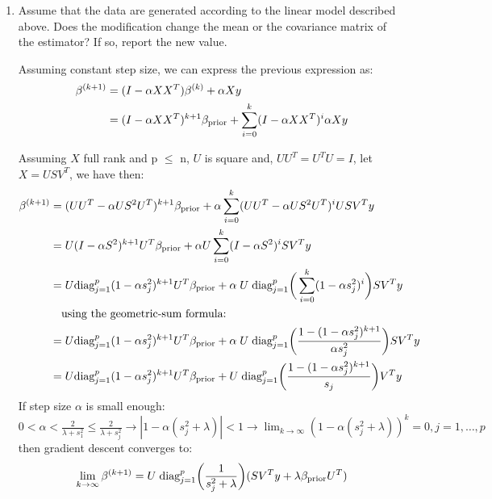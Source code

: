 \documentclass[12pt,twoside]{article}
\begin{document}
\begin{enumerate}
\begin{enumerate}
    \item Assume that the data are generated according to the linear model described above. Does the modification change the mean or the covariance matrix of the estimator? If so, report the new value.\\
    
\medskip

Assuming constant step size, we can express the previous expression as:
\begin{align*}
		\beta^{(k+1)}	&=	( I - \alpha X X^T ) \beta^{(k)} +  \alpha X y \\
					&=	(I - \alpha X X^T)^{k+1} \beta_{\operatorname{prior}}	+ \sum_{i=0}^k (I - \alpha X X^T)^i \alpha X y 
\end{align*}

Assuming $X$ full rank and p $\le$ n, $U$ is square and, $UU^T = U^TU = I$, let $X = USV^T$, we have then:
\begin{align*}
		\beta^{(k+1)}	&=	(UU^T - \alpha US^2 U^T)^{k+1} \beta_{\operatorname{prior}}	+ \alpha \sum_{i=0}^k      (UU^T - \alpha US^2U^T)^i U S V^T y \\
					&=    U (I - \alpha S^2)^{k+1}  U^T  \beta_{\operatorname{prior}}		+ \alpha U \sum_{i=0}^k  (I - \alpha S^2)^i S V^T y \\
					&=	U \text{diag}_{j=1}^p  (1 - \alpha s_j^2)^{k+1} U^T   \beta_{\operatorname{prior}} + \alpha \; U  \;  \text{diag}_{j=1}^p \bigg( \sum_{i=0}^k (1 - \alpha s_j^2 )^i \bigg)  S V^T y \\
					& \text{ ~ using the geometric-sum formula: } \\
					&= 	U \text{diag}_{j=1}^p  (1 - \alpha s_j^2)^{k+1} U^T   \beta_{\operatorname{prior}} + \alpha \; U  \;  \text{diag}_{j=1}^p \bigg( \frac{ 1 - (1 - \alpha s_j^2 )^{k+1}} {\alpha s_j^2} \bigg)  S V^T y \\
					&=    U \text{diag}_{j=1}^p  (1 - \alpha s_j^2)^{k+1} U^T   \beta_{\operatorname{prior}} + U  \;  \text{diag}_{j=1}^p \bigg( \frac{ 1 - (1 - \alpha s_j^2 )^{k+1}} {s_j} \bigg)  V^T y \\
\end{align*}
If step size $\alpha$ is small enough: $0 < \alpha < \frac{2} {\lambda + s_1^2} \le \frac{2} {\lambda + s_j^2} \rightarrow |1 - \alpha (s_j^2 + \lambda)| < 1 \rightarrow \lim_{k \rightarrow \infty} (1 - \alpha (s_j^2 + \lambda))^k =0, j=1, \dots ,p $ then gradient descent converges to:
$$\lim_{k \rightarrow \infty} \beta^{(k+1)} = U  \;  \text{diag}_{j=1}^p \bigg( \frac{1} {s_j^2 + \lambda} \bigg)  (S V^T y + \lambda \beta_{\operatorname{prior}}  U^T)$$


\end{enumerate}
\end{enumerate}
\end{document}
